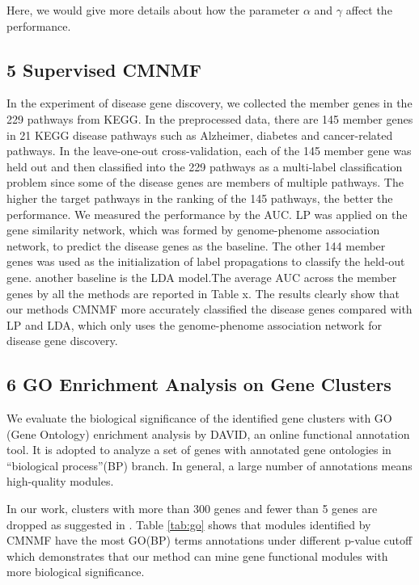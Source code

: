 \documentclass{bmcart}
\begin{document}
Here, we would give more details about how the parameter $\alpha$ and $\gamma$ affect the performance.

\subsection*{\textbf{5 Supervised CMNMF}}
In the experiment of disease gene discovery, we collected the member genes in the 229 pathways from KEGG. In the preprocessed data, there are 145 member genes in 21 KEGG disease pathways such as Alzheimer, diabetes and cancer-related pathways. In the leave-one-out cross-validation, each of the 145 member gene was held out and then classified into the 229 pathways as a multi-label classification problem since some of the disease genes are
members of multiple pathways. The higher the target pathways in the ranking of the 145 pathways, the better the performance. We measured the performance by the AUC. LP was applied on the gene similarity network, which was formed by genome-phenome association network, to predict the disease genes as the baseline. The other 144 member genes was used as the initialization of label propagations to classify the held-out gene. another baseline is the LDA model.The average AUC across the  member genes by all the methods are reported in Table x. The results clearly show that our methods CMNMF more accurately classified the disease genes compared with LP and LDA, which only uses the genome-phenome association network for disease gene discovery.

\subsection*{\textbf{6 GO Enrichment Analysis on Gene Clusters}}

We evaluate the biological significance of the identified gene clusters with GO (Gene Ontology) enrichment analysis by DAVID\cite{David}, an online functional annotation tool. It is adopted to analyze a set of genes with annotated gene ontologies in ``biological process''(BP) branch. In general, a large number of annotations means high-quality modules.

In our work, clusters with more than 300 genes and fewer than 5 genes are dropped as suggested in \cite{SMNMF}. Table \ref{tab:go} shows that modules identified by CMNMF have the most GO(BP) terms annotations under different p-value cutoff which demonstrates that our method can mine gene functional modules with more biological significance.
\end{document}
